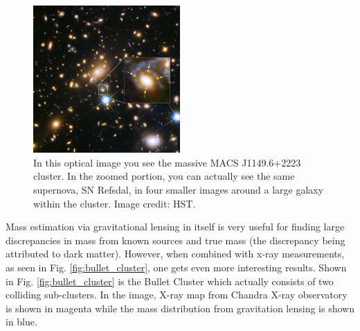 \documentclass[12pt,twoside]{report}
\begin{document}
\begin{figure}
	\centering
	\caption{In this optical image you see the massive MACS J1149.6+2223 cluster.  In the zoomed portion, you can actually see the same supernova, SN Refsdal, in four smaller images around a large galaxy within the cluster. Image credit: HST.}
	\includegraphics[width=0.5\textwidth]{einstein_cross}
\end{figure}

Mass estimation via gravitational lensing in itself is very useful for finding large discrepancies in mass from known sources and true mass (the discrepancy being attributed to dark matter).  However, when combined with x-ray measurements, as seen in Fig. \ref{fig:bullet_cluster}, one gets even more interesting results.  Shown in Fig. \ref{fig:bullet_cluster} is the Bullet Cluster which actually consists of two colliding sub-clusters.  In the image, X-ray map from Chandra X-ray observatory is shown in magenta while the mass distribution from gravitation lensing is shown in blue.  
\end{document}

